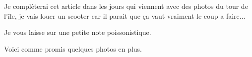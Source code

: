 \begin{multicols}{2}
Je complèterai cet article dans les jours qui viennent avec des photos du tour de l'île, je vais louer un scooter car il parait que ça vaut vraiment le coup a faire...

Je vous laisse sur une petite note poissonistique.


Voici comme promis quelques photos en plus.




\end{multicols}


